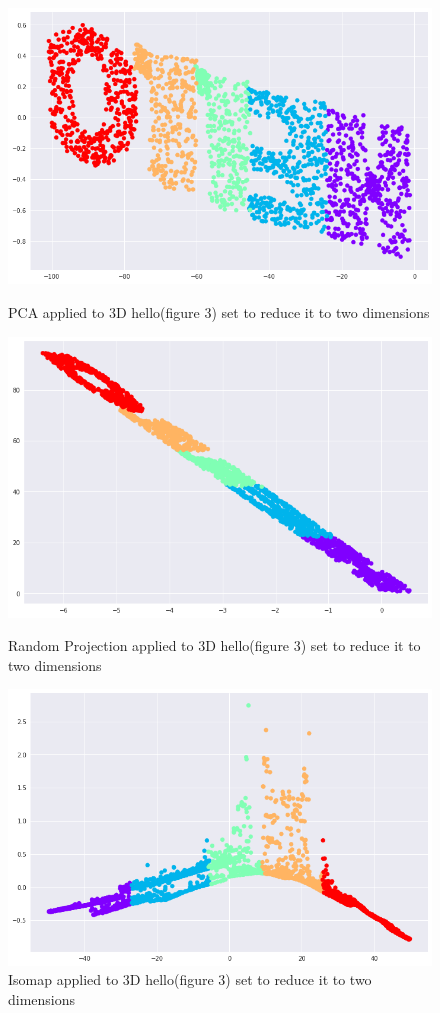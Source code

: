 \documentclass[a4paper]{article}
\begin{document}
\begin{figure}[H]
\centering
\includegraphics[scale = 0.32]{pca_part1.png}
\caption{\label{fig:pca_part1}PCA applied to 3D hello(figure 3) set to reduce it to two dimensions}
\includegraphics[scale = 0.32]{random_projection_part1.png}
\caption{\label{fig:random_projection_part1}Random Projection applied to 3D hello(figure 3) set to reduce it to two dimensions}

\includegraphics[scale = 0.32]{isomap_part1.png}
\caption{\label{fig:isomap_part1}Isomap applied to 3D hello(figure 3) set to reduce it to two dimensions}

\end{figure}
\end{document}
